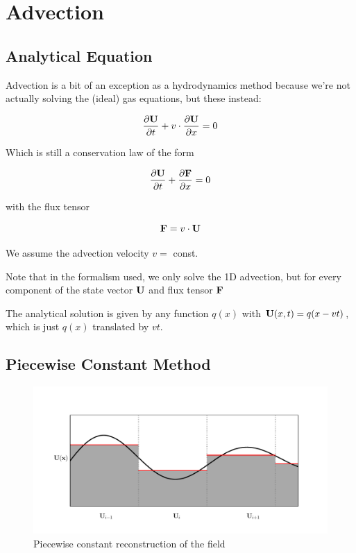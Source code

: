 \newpage
\section{Advection}

\subsection{Analytical Equation}

Advection is a bit of an exception as a hydrodynamics method because we're not actually solving the (ideal) gas equations, but these instead:

\begin{equation}
	\frac{\partial  \mathbf{U} }{\partial t} + v \cdot \frac{\partial \mathbf{U}}{\partial x} = 0
\end{equation}


Which is still a conservation law of the form

\begin{equation}
	\frac{\partial  \mathbf{U} }{\partial t} + \frac{\partial \mathbf{F}}{\partial x} = 0
\end{equation}

with the flux tensor 

\begin{equation}
	\mathbf{F} = v \cdot \mathbf{U}
\end{equation}

We assume the advection velocity $v = $ const.

Note that in the formalism used, we only solve the 1D advection, but for every component of the state vector $\mathbf{U}$ and flux tensor $\mathbf{F}$

The analytical solution is given by any function $q(x)$ with $\mathbf{U}(x,t) = q(x - v t)$, which is just $q(x)$ translated by $v t$.




\subsection{Piecewise Constant Method}

\begin{figure}[htbp]
	\includegraphics[width=\textwidth]{./figures/piecewise_const.pdf}%
	\caption{Piecewise constant reconstruction of the field
		\label{fig:pwconst}
	}
\end{figure}



